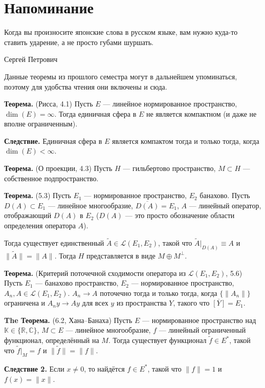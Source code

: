 \setcounter{section}{-1}
\section{Напоминание}
\epigraph{Когда вы произносите японские слова в русском языке, вам нужно куда-то ставить ударение, а не просто губами шуршать.}{Сергей Петрович}

Данные теоремы из прошлого семестра могут в дальнейшем упоминаться, поэтому для удобства чтения они включены и сюда.

\label{th:4-1} \textbf{Теорема.} (Рисса, 4.1) Пусть $E$ --- линейное нормированное пространство, $\dim(E) = \infty$.
Тогда единичная сфера в $E$ не является компактном (и даже не вполне ограниченным).

\textbf{Следствие.} Единичная сфера в $E$ является компактом тогда и только тогда, когда $\dim(E) < \infty$.

\label{th:4-3} \textbf{Теорема.} (О проекции, 4.3) Пусть $H$ --- гильбертово пространство, $M \subset H$ --- собственное подпространство.

\label{th:5-3} \textbf{Теорема.} (5.3) Пусть $E_1$ --- нормированное пространство, $E_2$ банахово.
Пусть $D(A) \subset E_1$ --- линейное многообразие, $\overline{D(A)} = E_1$, $A$ --- линейный оператор, отображающий $D(A)$ в $E_2$ ($D(A)$ --- это просто обозначение области определения оператора $A$).

Тогда существует единственный $\widetilde A \in \mathcal L(E_1, E_2)$, такой что $\widetilde A|_{D(A)} \equiv A$ и $\|\widetilde A\| = \|A\|$.
Тогда $H$ представляется в виде $M \oplus M^\bot$.

\label{th:5-6} \textbf{Теорема.} (Критерий поточечной сходимости оператора из $\mathcal L(E_1, E_2)$, 5.6)
Пусть $E_1$ --- банахово пространство, $E_2$ --- нормированное пространство, $A_n, A \in \mathcal L(E_1, E_2)$.
$A_n \to A$ поточечно тогда и только тогда, когда $\{\|A_n\|\}$ ограничена и $A_n y \to Ay$ для всех $y$ из пространства $Y$, такого что $\overline{[Y]} = E_1$.

\textbf{The Теорема.} (6.2, Хана--Банаха) Пусть $E$ --- нормированное пространство над $\mathbb K \in \{\mathbb R, \mathbb C\}$, $M \subset E$ --- линейное многообразие, $f$ --- линейный ограниченный функционал, определённый на $M$.
Тогда существует функционал $\widetilde f \in E^*$, такой что $\widetilde f|_M = f$ и $\|\widetilde f\| = \|f\|$.

\label{th:hahn-banach-coll-2} \textbf{Следствие 2.} Если $x \ne 0$, то найдётся $f \in E^*$, такой что $\|f\| = 1$ и $f(x) = \|x\|$.


